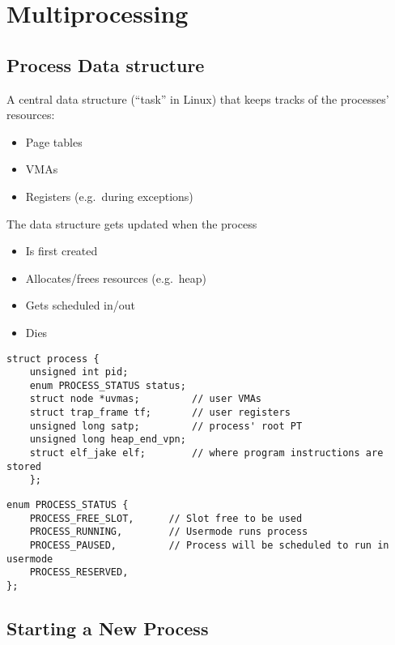 \section{Multiprocessing}
\subsection{Process Data structure}
A central data structure (``task'' in Linux) that keeps tracks of the processes' resources:
\begin{itemize}
    \item Page tables
    \item VMAs
    \item Registers (e.g.\ during exceptions)
\end{itemize}
The data structure gets updated when the process
\begin{itemize}
    \item Is first created
    \item Allocates/frees resources (e.g.\ heap)
    \item Gets scheduled in/out
    \item Dies
\end{itemize}

\newpar{}
\begin{lstlisting}[style=bright_C++]
struct process {
    unsigned int pid;
    enum PROCESS_STATUS status; 
    struct node *uvmas;         // user VMAs
    struct trap_frame tf;       // user registers
    unsigned long satp;         // process' root PT
    unsigned long heap_end_vpn;
    struct elf_jake elf;        // where program instructions are stored
    };
\end{lstlisting}
\newpar{}
\begin{lstlisting}[style=bright_C++]
enum PROCESS_STATUS {
    PROCESS_FREE_SLOT, 	    // Slot free to be used
    PROCESS_RUNNING, 	    // Usermode runs process
    PROCESS_PAUSED, 	    // Process will be scheduled to run in usermode
    PROCESS_RESERVED,
};
\end{lstlisting}

\subsection{Starting a New Process}
